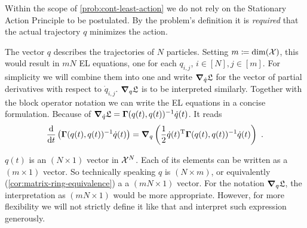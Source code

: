 Within the scope of \cref{prob:cont-least-action} we do not rely on the Stationary Action Principle to be postulated.
By the problem's definition it is \emph{required} that the actual trajectory $q$ minimizes the action.

The vector $q$ describes the trajectories of $N$ particles.
Setting $m \coloneqq \mathrm{dim}(\mathcal{X})$, this would result in $mN$ EL equations, one for each $q_{i, j}$, $i \in [N], j \in [m]$.
For simplicity we will combine them into one and write $\grad_{\dot{q}} \mathfrak{L}$ for the vector of partial derivatives with respect to $\dot{q}_{i, j}$.
$\grad_q \mathfrak{L}$ is to be interpreted similarly.
Together with the block operator notation we can write the EL equations in a concise formulation.
Because of $\grad_{\dot{q}} \mathfrak{L} = \mathbf{\Gamma}(q(t), q(t))^{-1} \dot{q}(t)$. It reads
\begin{equation}
\label{eq:concrete-lagrangian}
	\frac{\mathrm{d}}{\mathrm{d}t} \left(\mathbf{\Gamma}(q(t), q(t))^{-1} \dot{q}(t) \right)
	= \grad_q \left(\frac{1}{2} \dot{q}(t)^\mathrm{T} \mathbf{\Gamma}(q(t), q(t))^{-1} \dot{q}(t)\right) \ .
\end{equation}

$q(t)$ is an $(N\times1)$ vector in $\mathcal{X}^N$.
Each of its elements can be written as a $(m\times1)$ vector.
So technically speaking $q$ is $(N \times m)$, or equivalently (\cref{cor:matrix-ring-equivalence}) a a $(mN \times 1)$ vector.
For the notation $\grad_q \mathfrak{L}$, the interpretation as $(mN \times 1)$ would be more appropriate.
However, for more flexibility we will not strictly define it like that and interpret such expression generously.